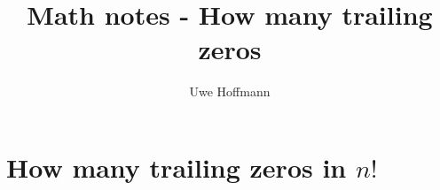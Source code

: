 

\title{Math notes - How many trailing zeros}
\author{Uwe Hoffmann}



\setcounter{chapter}{1}
\chapter*{How many trailing zeros in $n!$}
